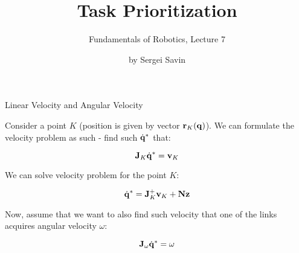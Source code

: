 \documentclass{beamer}
\title{Task Prioritization}
\subtitle{Fundamentals of Robotics, Lecture 7}
\author{by Sergei Savin}
\date{\mydate}
\begin{document}
\maketitle





\begin{frame}{Linear Velocity and Angular Velocity}
	\begin{flushleft}
		
		Consider a point $K$ (position is given by vector $\mathbf{r}_K(\mathbf{q})$). We can formulate the velocity problem as such - find such $\dot{\mathbf{q}}^*$ that:
		
		\begin{equation}
			\mathbf{J}_K \dot{\mathbf{q}}^* = \mathbf{v}_K
		\end{equation}		
		
		We can solve velocity problem for the point $K$:
		
		\begin{equation}
			\dot{\mathbf{q}}^* = \mathbf{J}_K^+ \mathbf{v}_K + \mathbf{N} \mathbf{z}
		\end{equation}
	
		Now, assume that we want to also find such velocity that one of the links acquires angular velocity $\omega$:
	
		\begin{equation}
			\mathbf{J}_\omega \dot{\mathbf{q}}^* = \omega
		\end{equation}							
		
	\end{flushleft}
\end{frame}
\end{document}
